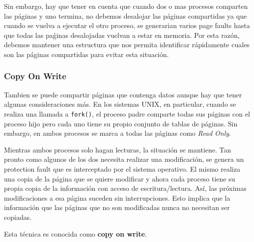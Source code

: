 Sin embargo, hay que tener en cuenta que cuando dos o mas procesos comparten las páginas y uno termina, no debemos desalojar las páginas compartidas ya que cuando se vuelva a ejecutar el otro proceso, se generarian varios page faults hasta que todas las paǵinas desalojadas vuelvan a estar en memoria. Por esta razón, debemos mantener una estructura que nos permita identificar rápidamente cuales son las páginas compartidas para evitar esta situación.

\subsubsection{Copy On Write}
Tambien se puede compartir páginas que contenga datos aunque hay que tener algunas consideraciones más. En los sistemas UNIX, en particular, cuando se realiza una llamada a \texttt{fork()}, el proceso padre comparte todas sus páginas con el proceso hijo pero cada uno tiene su propio conjunto de tablas de páginas. Sin embargo, en ambos procesos se marca a todas las páginas como \textit{Read Only}. 

Mientras ambos procesos solo hagan lecturas, la situación se mantiene. Tan pronto como algunos de los dos necesita realizar una modificación, se genera un protection fault que es interceptado por el sistema operativo. El mismo realiza una copia de la página que se quiere modificar y ahora cada proceso tiene su propia copia de la información con acceso de escritura/lectura. Así, las próximas modificaciones a esa página suceden sin interrupciones. Esto implica que la información que las páginas que no son modificadas nunca no necesitan ser copiadas.

Esta técnica es conocida como \textbf{copy on write}.

\printbibliography[keyword=segmentacion, title=Bibliografía]
 
 